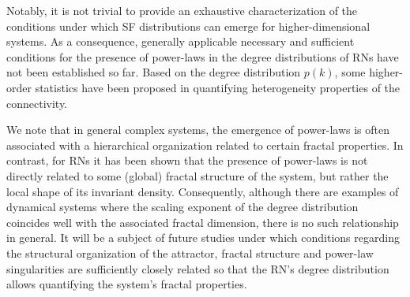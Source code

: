 		Notably, it is not trivial to provide an exhaustive characterization of the conditions under which SF distributions can emerge for higher-dimensional systems. As a consequence, generally applicable necessary and sufficient conditions for the presence of power-laws in the degree distributions of RNs have not been established so far. Based on the degree distribution $p(k)$, some higher-order statistics have been proposed in \cite{Jocob2016} quantifying heterogeneity properties of the connectivity.

		We note that in general complex systems, the emergence of power-laws is often associated with a hierarchical organization related to certain fractal properties. In contrast, for RNs it has been shown that the presence of power-laws is not directly related to some (global) fractal structure of the system, but rather the local shape of its invariant density. Consequently, although there are examples of dynamical systems where the scaling exponent of the degree distribution coincides well with the associated fractal dimension, there is no such relationship in general. It will be a subject of future studies under which conditions regarding the structural organization of the attractor, fractal structure and power-law singularities are sufficiently closely related so that the RN's degree distribution allows quantifying the system's fractal properties.


